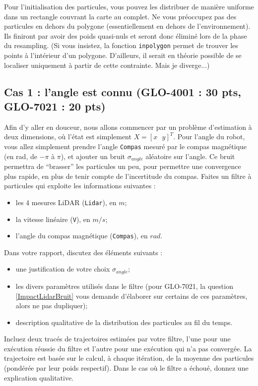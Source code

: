 \documentclass[12pt]{article}
\begin{document}
Pour l'initialisation des particules, vous pouvez les distribuer de manière uniforme dans un rectangle couvrant la carte au complet. Ne vous préoccupez pas des particules en dehors du polygone (essentiellement en dehors de l'environnement). Ils finiront par avoir des poids quasi-nuls et seront donc éliminé lors de la phase du resampling. (Si vous insistez, la fonction \texttt{inpolygon} permet de trouver les points à l'intérieur d'un polygone. D'ailleurs, il serait en théorie possible de se localiser uniquement à partir de cette contrainte. Mais je diverge...)

\subsection{Cas 1 : l'angle est connu (GLO-4001 : 30 pts, GLO-7021 : 20 pts)}
\label{Q1Global}
Afin d'y aller en douceur, nous allons commencer par un problème d'estimation à deux dimensions, où l'état est simplement $X=[x\mbox{ } y]^T$. Pour l'angle du robot, vous allez simplement prendre l'angle \texttt{Compas} mesuré par le compas magnétique (en rad, de $-\pi$ à $\pi$), et ajouter un bruit $\sigma_{angle}$ aléatoire sur l'angle. Ce bruit permettra de ``brasser'' les particules un peu, pour permettre une convergence plus rapide, en plus de tenir compte de l'incertitude du compas.  Faites un filtre à particules qui exploite les informations suivantes :
\begin{itemize}
\item les 4 mesures LiDAR (\texttt{Lidar}), en $m$;
\item la vitesse linéaire (\texttt{V}), en $m/s$;
\item l'angle du compas magnétique  (\texttt{Compas}), en $rad$.
\end{itemize}

\vspace{0.1in}
Dans votre rapport, discutez des éléments suivants :
\begin{itemize}
\item une justification de votre choix $\sigma_{angle}$;
\item les divers paramètres utilisés dans le filtre (pour GLO-7021, la question \ref{ImpactLidarBruit} vous demande d'élaborer sur certains de ces paramètres, alors ne pas dupliquer);
\item description qualitative de la distribution des particules au fil du temps.
\end{itemize}

Incluez deux tracés de trajectoires estimées par votre filtre, l'une pour une exécution réussie du filtre et l'autre pour une exécution qui n'a pas convergée. La  trajectoire est basée sur le calcul, à chaque itération, de la moyenne des particules (pondérée par leur poids respectif). Dans le cas où le filtre a échoué, donnez une explication qualitative.
\end{document}
